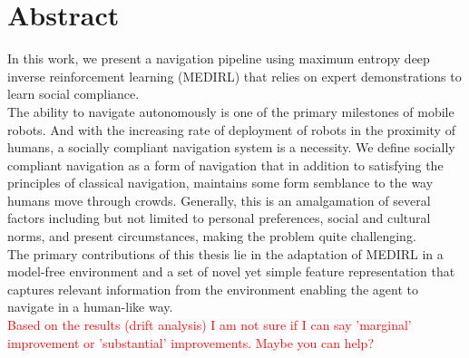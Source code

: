 \chapter*{\rm\bfseries Abstract}
In this work, we present a navigation pipeline using maximum entropy deep inverse reinforcement learning (MEDIRL) that relies on expert demonstrations to learn social compliance.\\
The ability to navigate autonomously is one of the primary milestones of mobile robots. And with the increasing rate of deployment of robots in the proximity of humans, a socially compliant navigation system is a necessity. We define socially compliant navigation as a form of navigation that in addition to satisfying the principles of classical navigation, maintains some form semblance to the way humans move through crowds. Generally, this is an amalgamation of several factors including but not limited to personal preferences, social and cultural norms, and present circumstances, making the problem quite challenging.\\
 The primary contributions of this thesis lie in the adaptation of MEDIRL in a model-free environment and a set of novel yet simple feature representation that captures relevant information from the environment enabling the agent to navigate in a human-like way. \\
  \textcolor{red}{Based on the results (drift analysis) I am not sure if I can say 'marginal' improvement or 'substantial' improvements. Maybe you can help?}
 
 


